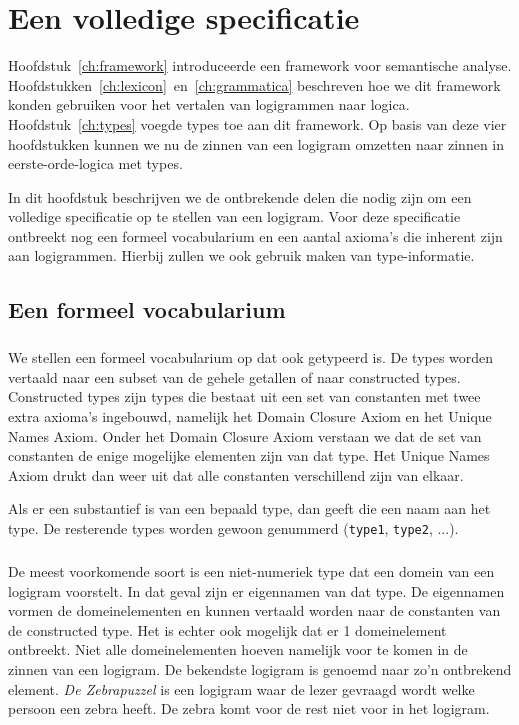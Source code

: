 \chapter{Een volledige specificatie}
\label{ch:specificatie}

Hoofdstuk~\ref{ch:framework} introduceerde een framework voor semantische analyse. Hoofdstukken~\ref{ch:lexicon}~en~\ref{ch:grammatica} beschreven hoe we dit framework konden gebruiken voor het vertalen van logigrammen naar logica. Hoofdstuk~\ref{ch:types} voegde types toe aan dit framework. Op basis van deze vier hoofdstukken kunnen we nu de zinnen van een logigram omzetten naar zinnen in eerste-orde-logica met types.

In dit hoofdstuk beschrijven we de ontbrekende delen die nodig zijn om een volledige specificatie op te stellen van een logigram. Voor deze specificatie ontbreekt nog een formeel vocabularium en een aantal axioma's die inherent zijn aan logigrammen. Hierbij zullen we ook gebruik maken van type-informatie.

\section{Een formeel vocabularium}
\label{sec:vocabularium}
\paragraph{} We stellen een formeel vocabularium op dat ook getypeerd is. De types worden vertaald naar een subset van de gehele getallen of naar constructed types. Constructed types zijn types die bestaat uit een set van constanten met twee extra axioma's ingebouwd, namelijk het Domain Closure Axiom en het Unique Names Axiom. Onder het Domain Closure Axiom verstaan we dat de set van constanten de enige mogelijke elementen zijn van dat type. Het Unique Names Axiom drukt dan weer uit dat alle constanten verschillend zijn van elkaar.

Als er een substantief is van een bepaald type, dan geeft die een naam aan het type. De resterende types worden gewoon genummerd (\texttt{type1}, \texttt{type2}, ...).

\paragraph{} De meest voorkomende soort is een niet-numeriek type dat een domein van een logigram voorstelt. In dat geval zijn er eigennamen van dat type. De eigennamen vormen de domeinelementen en kunnen vertaald worden naar de constanten van de constructed type. Het is echter ook mogelijk dat er 1 domeinelement ontbreekt. Niet alle domeinelementen hoeven namelijk voor te komen in de zinnen van een logigram. De bekendste logigram is genoemd naar zo'n ontbrekend element. \textit{De Zebrapuzzel} \cite{zebra} is een logigram waar de lezer gevraagd wordt welke persoon een zebra heeft. De zebra komt voor de rest niet voor in het logigram.

